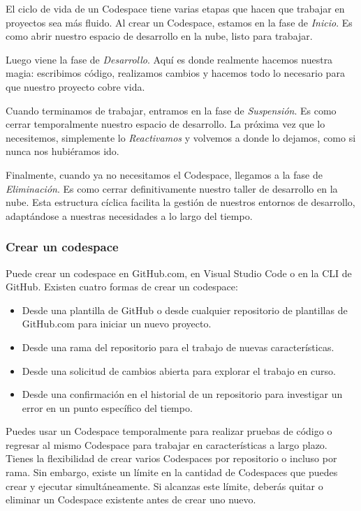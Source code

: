El ciclo de vida de un Codespace tiene varias etapas que hacen que trabajar en proyectos sea más
fluido. Al crear un Codespace, estamos en la fase de \textit{Inicio}. Es como abrir nuestro espacio
de desarrollo en la nube, listo para trabajar.

Luego viene la fase de \textit{Desarrollo}. Aquí es donde realmente hacemos nuestra magia: escribimos código, realizamos
cambios y hacemos todo lo necesario para que nuestro proyecto cobre vida.

Cuando terminamos de trabajar, entramos en la fase de \textit{Suspensión}. Es como cerrar temporalmente nuestro espacio
de desarrollo. La próxima vez que lo necesitemos, simplemente lo \textit{Reactivamos} y volvemos a donde lo dejamos,
como si nunca nos hubiéramos ido.

Finalmente, cuando ya no necesitamos el Codespace, llegamos a la fase de \textit{Eliminación}. Es como cerrar definitivamente
nuestro taller de desarrollo en la nube. Esta estructura cíclica facilita la gestión de nuestros entornos de desarrollo,
adaptándose a nuestras necesidades a lo largo del tiempo.

\subsubsection{Crear un codespace}

Puede crear un codespace en GitHub.com, en Visual Studio Code o en la CLI de GitHub. Existen cuatro formas de crear un codespace:

\begin{itemize}
    \item Desde una plantilla de GitHub o desde cualquier repositorio de plantillas de GitHub.com para iniciar un nuevo proyecto.
    \item Desde una rama del repositorio para el trabajo de nuevas características.
    \item Desde una solicitud de cambios abierta para explorar el trabajo en curso.
    \item Desde una confirmación en el historial de un repositorio para investigar un error en un punto específico del tiempo.
\end{itemize}

Puedes usar un Codespace temporalmente para realizar pruebas de código o regresar al mismo Codespace para trabajar
 en características a largo plazo. Tienes la flexibilidad de crear varios Codespaces por repositorio o incluso por 
 rama. Sin embargo, existe un límite en la cantidad de Codespaces que puedes crear y ejecutar simultáneamente. Si 
 alcanzas este límite, deberás quitar o eliminar un Codespace existente antes de crear uno nuevo.


